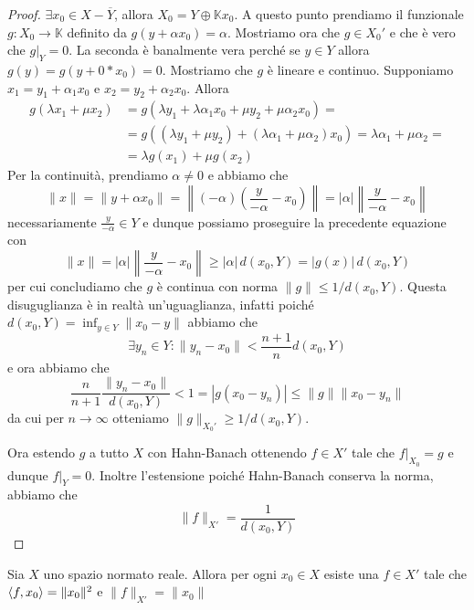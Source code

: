 \begin{proof}{}
    \(\exists x_{0} \in X - \overline{Y}\), allora \(X_{0} = Y \oplus \mathbb{K} x_{0}\). A questo punto prendiamo il funzionale \(g : X_{0} \to \mathbb{K}\) definito da \(g{(y + \alpha x_{0})} = \alpha\). Mostriamo ora che \(g \in X_{0}'\) e che è vero che \(g|_Y = 0\). La seconda è banalmente vera perché se \(y \in Y\) allora \(g{(y)} = g{(y + 0*x_{0})} = 0\). Mostriamo che \(g\) è lineare e continuo. 
    Supponiamo \(x_{1} = y_{1} + \alpha_{1} x_{0}\) e \(x_{2} = y_{2} + \alpha_{2} x_{0}\). Allora
    \begin{align*}
        g{(\lambda x_{1} + \mu x_{2})} &= g{(\lambda y_{1} + \lambda \alpha_{1} x_{0} + \mu y_{2} + \mu \alpha_{2} x_{0})} = \\
        &= g{({(\lambda y_{1} + \mu y_{2})} + {(\lambda \alpha_{1} + \mu \alpha_{2})} x_{0})} = \lambda \alpha_{1} + \mu \alpha_{2} = \\
        &= \lambda g{(x_{1})} + \mu g{(x_{2})}
    \end{align*}
    Per la continuità, prendiamo \(\alpha \neq 0\) e abbiamo che
    \[
      \|x\| = \| y + \alpha x_{0}\| = \left\|{(-\alpha)}{\left(  \frac{y}{-\alpha} - x_{0} \right)} \right\| = | \alpha | \left\| \frac{y}{-\alpha} - x_{0}\right\|
    \]
    necessariamente \(\frac{y}{-\alpha} \in Y\) e dunque
    possiamo proseguire la precedente equazione con 
    \[
      \|x\| = | \alpha | \left\| \frac{y}{-\alpha} - x_{0}\right\| \ge
      |\alpha|\, d{(x_{0}, Y)} = |g{(x)}| \,d(x_{0}, Y)
    \]
    per cui concludiamo che \(g\) è continua con norma \(\|g\|\le 1 / {d{(x_{0},
    Y)}}\). Questa disuguglianza è in realtà un'uguaglianza, infatti
    poiché \(d{(x_{0}, {Y})} = \inf_{y \in {Y}} \|x_{0} - y\|\) abbiamo che
    \[
      \exists  y_{n} \in {Y} : \|y_{n} - x_{0}\| < \frac{n+1}{n} d{(x_{0}, {Y})}
    \]
    e ora abbiamo che
    \[
      \frac{n}{n+1} \frac{\|y_{n} - x_{0}\|}{d{(x_{0}, Y)}} < 1 = | g{(x_{0} -
      y_{n})} | \le \|g\| \|x_{0} - y_{n}\|
    \]
    da cui per \(n \to \infty\) otteniamo \(\|g\|_{X_{0}'} \ge 1 / d{(x_{0}, Y)}\).

    Ora estendo \(g\) a tutto \(X\) con Hahn-Banach ottenendo \(f \in X'\) tale
    che \(f|_{X_{0}}  = g \) e dunque \(f|_Y = 0\). Inoltre l'estensione poiché
    Hahn-Banach conserva la norma, abbiamo che
    \[
      \|f\|_{X'} = \frac{1}{d{(x_{0}, Y)}}
    \]
\end{proof}
\begin{corollary}{}
    Sia \(X\) uno spazio normato reale. Allora per ogni \(x_{0} \in X\) esiste una \(f \in X'\) tale che \({\left\langle f, x_{0}\right\rangle} = \|x_{0}\|^2\) e \(\|f\|_{X'} = \|x_{0}\|\) 
\end{corollary}
